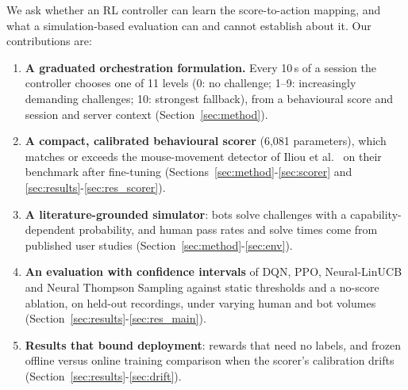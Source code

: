 \documentclass{ieeetj}
\begin{document}
We ask whether an RL controller can learn the score-to-action mapping, and what a simulation-based evaluation can and cannot establish about it. Our contributions are:
\begin{enumerate}[label=\roman*), leftmargin=*, itemsep=1pt]
\item \textbf{A graduated orchestration formulation.} Every 10\,s of a session the controller chooses one of 11 levels (0: no challenge; 1--9: increasingly demanding challenges; 10: strongest fallback), from a behavioural score and session and server context (Section~\ref{sec:method}).
\item \textbf{A compact, calibrated behavioural scorer} (6{,}081 parameters), which matches or exceeds the mouse-movement detector of Iliou et al.\ \cite{iliou_2021} on their benchmark after fine-tuning (Sections~\ref{sec:method}-\ref{sec:scorer} and \ref{sec:results}-\ref{sec:res_scorer}).
\item \textbf{A literature-grounded simulator}: bots solve challenges with a capability-dependent probability, and human pass rates and solve times come from published user studies \cite{bursztein_humans_2010,captcha_study_2023} (Section~\ref{sec:method}-\ref{sec:env}).
\item \textbf{An evaluation with confidence intervals} of DQN, PPO, Neural-LinUCB and Neural Thompson Sampling against static thresholds and a no-score ablation, on held-out recordings, under varying human and bot volumes (Section~\ref{sec:results}-\ref{sec:res_main}).
\item \textbf{Results that bound deployment}: rewards that need no labels, and frozen offline versus online training comparison when the scorer's calibration drifts (Section~\ref{sec:results}-\ref{sec:drift}).
\end{enumerate}

\vspace{-5pt}
\end{document}
